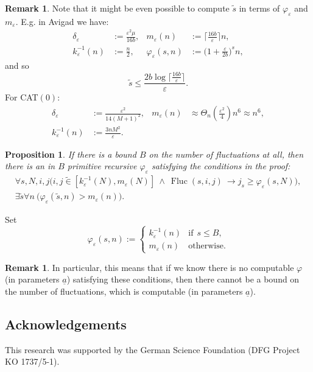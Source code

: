 \documentclass[1p]{elsarticle}
\DeclareMathOperator{\Fluc}{Fluc}
\newcommand{\tup}{\underline} %
\newcommand{\Tif}{\text{if}\ }
\newcommand{\Telse}{\text{otherwise}}
\theoremstyle{plain}
\newtheorem{prop}[thm]{Proposition}
\theoremstyle{definition}
\newtheorem{rmk}[thm]{Remark}
\theoremstyle{remark}
\renewenvironment{proof}[1][]{\noindent{\bf Proof{#1}. }}{\nopagebreak[4]{\hspace*{\fill}
  $\Box$              %
 }{\vspace{2ex}}}
\renewcommand{\phi}{\varphi}
\renewcommand{\epsilon}{\varepsilon}
\theoremstyle{definition}
\begin{document}
{\begin{rmk}
Note that it might be even possible to compute $\tilde s$ in terms of $\phi_\epsilon$ and $m_\epsilon$. E.g. in Avigad we have:
\begin{align*}
\delta_\epsilon &:= \frac{\epsilon^2\mu}{16b},& m_\epsilon(n)&:=\big\lceil \frac{16b}{\epsilon}\big\rceil n,\\
k^{-1}_\epsilon(n)&:=\frac{n}{2},& \phi_\epsilon(s,n)&:=\big(1+ \frac{\epsilon}{2b}\big)^s n,
\end{align*}
and so \[ \tilde s \leq \frac{ 2 b\log \big\lceil \frac{16b}{\epsilon}\big\rceil }{\epsilon}.\]
For CAT$(0)$:
\begin{align*}
\delta_\epsilon &:= \frac{\epsilon^2}{14(M+1)^2},& m_\epsilon(n)&\approx \Theta_n(\frac{\epsilon^2}{4})n^6\approx n^6,\\
k^{-1}_\epsilon(n)&:=\frac{3nM^2}{\epsilon}.& 
\end{align*}

\end{rmk}

\begin{prop}
If there is a bound $B$ on the number of fluctuations at all, then there is an in $B$ primitive recursive $\phi_\epsilon$
satisfying the conditions in the proof:
\begin{align}
\forall s,N,i,j \big( i,j\tilde\in[k^{-1}_\epsilon(N),m_\epsilon(N)]\ \wedge\ \Fluc(s,i,j)\ \rightarrow j_s\geq \phi_\epsilon(s,N) \big),\label{e:FU1}\\
\exists \tilde s\forall n\ \big(\phi_\epsilon(\tilde s,n)>m_\epsilon(n)\big).\label{e:FU2}
\end{align}
\end{prop}
\begin{proof}
Set
\[
\phi_\epsilon(s,n):=\begin{cases}
k^{-1}_\epsilon(n)&\Tif\ s\leq B,\\
m_\epsilon(n)&\Telse.
\end{cases}
\]
\end{proof}

\begin{rmk}
In particular, this means that if we know there is no computable $\phi$ (in parameters $\tup a$) satisfying these conditions,
then there cannot be a bound on the number of fluctuations, which is computable (in parameters $\tup a$).
\end{rmk}

\subsection*{Acknowledgements}
This research was supported by the German Science Foundation (DFG Project KO 1737/5-1). 


}
\end{document}
